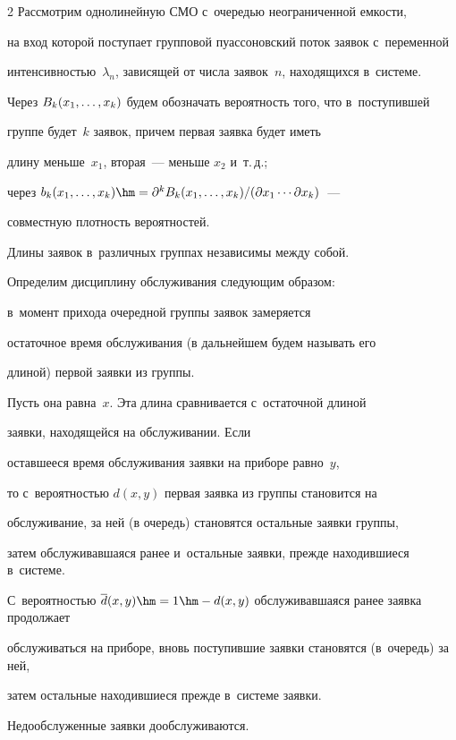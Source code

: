 \begin{multicols}{2}
Рассмотрим однолинейную СМО с~очередью неограниченной емкости,


на вход которой поступает групповой пуассоновский поток заявок с~переменной 


интенсивностью~$\lambda_n$, зависящей от числа заявок~$n$, находящихся в~системе.


Через $B_k(x_1,\ldots,x_k)$ будем обозначать вероятность того, что в~поступившей


группе будет~$k$ заявок, причем первая заявка будет иметь


длину меньше~$x_1$, вторая~--- меньше $x_2$ и~т.\,д.;


через $b_k(x_1,\ld,x_k)\hm=


\partial^k B_k(x_1,\ld,x_k)/(\partial x_1\cdots \partial x_k)$~--- 


совместную плотность вероятностей.


Длины заявок в~различных группах независимы между собой.





Определим дисциплину обслуживания сле\-ду\-ющим образом:


в~момент прихода очередной группы заявок замеряется


остаточное время обслуживания (в дальнейшем будем называть его


длиной) первой заявки из группы.


Пусть она равна~$x$. Эта длина сравнивается с~остаточной длиной


заявки, находящейся на обслуживании. Если


оставшееся время обслуживания заявки на приборе равно~$y$,


то с~вероятностью $d(x,y)$ первая заявка из группы становится на


обслуживание, за ней (в очередь) становятся остальные заявки группы,


затем обслуживавшаяся ранее и~остальные заявки, прежде находившиеся в~системе.


С~вероятностью $\d(x,y)\hm=1\hm-d(x,y)$ обслуживавшаяся ранее заявка продолжает


обслуживаться на приборе, вновь поступившие заявки становятся (в~очередь) за ней,


затем остальные находившиеся прежде в~системе заявки.


Недообслуженные заявки дообслуживаются.






\end{multicols}
